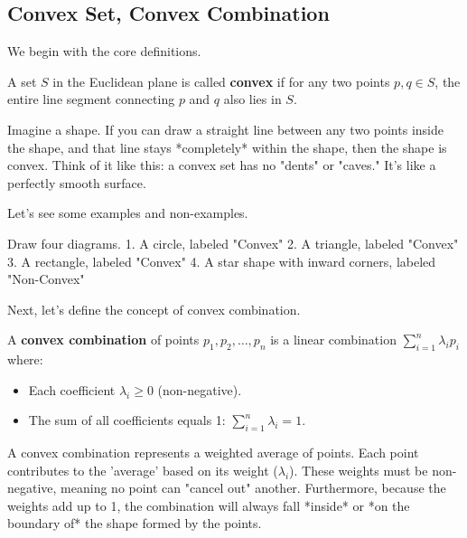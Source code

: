 \subsection{Convex Set, Convex Combination}
\label{sec:convex-set-convex-combination}

We begin with the core definitions.

\begin{definition}
\label{def:convex-set}
A set $S$ in the Euclidean plane is called \textbf{convex} if for any two points $p, q \in S$, the entire line segment connecting $p$ and $q$ also lies in $S$.
\end{definition}

\begin{intuition}
Imagine a shape. If you can draw a straight line between any two points inside the shape, and that line stays *completely* within the shape, then the shape is convex. Think of it like this: a convex set has no "dents" or "caves." It's like a perfectly smooth surface.
\end{intuition}

Let's see some examples and non-examples.

\begin{visualexample}
\label{vis:convex-examples}
Draw four diagrams.
1.  A circle, labeled "Convex"
2.  A triangle, labeled "Convex"
3.  A rectangle, labeled "Convex"
4.  A star shape with inward corners, labeled "Non-Convex"
\end{visualexample}

Next, let's define the concept of convex combination.

\begin{definition}
A \textbf{convex combination} of points $p_1, p_2, \ldots, p_n$ is a linear combination $\sum_{i=1}^{n} \lambda_i p_i$ where:
\begin{itemize}
    \item Each coefficient $\lambda_i \ge 0$ (non-negative).
    \item The sum of all coefficients equals 1: $\sum_{i=1}^{n} \lambda_i = 1$.
\end{itemize}
\end{definition}

\begin{intuition}
A convex combination represents a weighted average of points. Each point contributes to the 'average' based on its weight ($\lambda_i$). These weights must be non-negative, meaning no point can "cancel out" another. Furthermore, because the weights add up to 1, the combination will always fall *inside* or *on the boundary of* the shape formed by the points.
\end{intuition}

